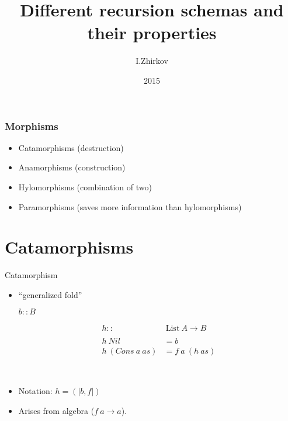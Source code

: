 \documentclass{beamer}
\title[]{Different recursion schemas and their properties}
\author{I.Zhirkov}
\date{2015}
\begin{document}
\begin{frame}
  \titlepage
\end{frame}


 
 
\begin{frame}
\frametitle{Morphisms}
\begin{itemize} 
    \item Catamorphisms (destruction)
    \item Anamorphisms (construction)
    \item Hylomorphisms (combination of two)
    \item Paramorphisms (saves more information than hylomorphisms)
\end{itemize}
\end{frame}


\section{Catamorphisms}

\begin{frame}{Catamorphism}
\begin{itemize}
\item ``generalized fold''

$b::B$



\begin{align*}
h::&\  \text{List}\ A \rightarrow B\\ 
\\
h\ Nil &= b\\
h\ (Cons \ a\ as) &=  f\ a\ (h\ as)
\end{align*}


~

\item Notation: $h = (\!|b, f|\!)$
\item Arises from algebra ($f\ a \rightarrow a$).
\end{itemize}

\end{frame}
\end{document}
